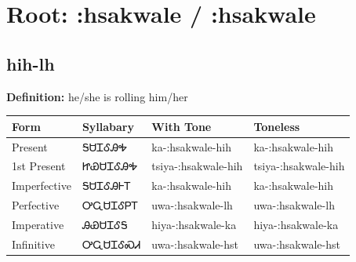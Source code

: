 \documentclass{article}%
\begin{document}
%
\normalsize%
\section*{Root: :hsakwale / :hsakwale}%
\subsection*{hih-lh}%
\textbf{Definition: }%
he/she is rolling him/her%
\\[0.5em]%
\begin{tabular}{|l|l|l|l|}%
\hline%
\textbf{Form}&\textbf{Syllabary}&\textbf{With Tone}&\textbf{Toneless}\\%
\hline%
Present&ᎦᏌᏆᎴᎯᎭ&ka{-}:hsakwale{-}hih&ka{-}:hsakwale{-}hih\\%
1st Present&ᏥᏯᏌᏆᎴᎯᎭ&tsiya{-}:hsakwale{-}hih&tsiya{-}:hsakwale{-}hih\\%
Imperfective&ᎦᏌᏆᎴᎯᎰᎢ&ka{-}:hsakwale{-}hih&ka{-}:hsakwale{-}hih\\%
Perfective&ᎤᏩᏌᏆᎴᏢᎢ&uwa{-}:hsakwale{-}lh&uwa{-}:hsakwale{-}lh\\%
Imperative&ᎯᏯᏌᏆᎴᎦ&hiya{-}:hsakwale{-}ka&hiya{-}:hsakwale{-}ka\\%
Infinitive&ᎤᏩᏌᏆᎴᏍᏗ&uwa{-}:hsakwale{-}hst&uwa{-}:hsakwale{-}hst\\%
\hline%
\end{tabular}%
\\[1em]%
\end{document}
